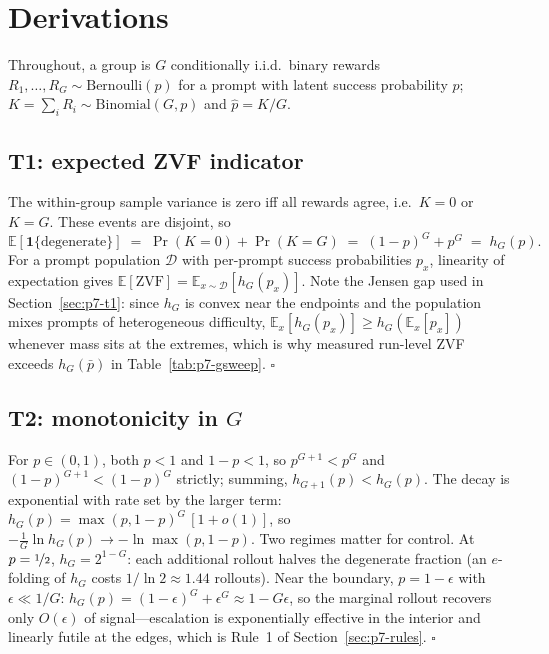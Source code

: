 \documentclass{article}
\providecommand{\eps}{\ensuremath{\epsilon}}
\newcommand{\E}{\mathbb{E}}
\begin{document}
\section{Derivations}
\label{sec:p7-appendix}
Throughout, a group is $G$ conditionally i.i.d.\ binary rewards
$R_1, \dots, R_G \sim \mathrm{Bernoulli}(p)$ for a prompt with latent
success probability $p$; $K = \sum_i R_i \sim \mathrm{Binomial}(G, p)$ and
$\hat p = K/G$.

\subsection{T1: expected ZVF indicator}
\label{sec:p7-appendix-t1}
The within-group sample variance is zero iff all rewards agree, i.e.\
$K = 0$ or $K = G$. These events are disjoint, so
\begin{equation}
  \E[\mathbf{1}\{\text{degenerate}\}]
  \;=\; \Pr(K = 0) + \Pr(K = G)
  \;=\; (1-p)^G + p^G
  \;=\; h_G(p).
\end{equation}
For a prompt population $\mathcal{D}$ with per-prompt success probabilities
$p_x$, linearity of expectation gives
$\E[\mathrm{ZVF}] = \E_{x \sim \mathcal{D}}[h_G(p_x)]$. Note the Jensen gap
used in Section~\ref{sec:p7-t1}: since $h_G$ is convex near the endpoints
and the population mixes prompts of heterogeneous difficulty,
$\E_x[h_G(p_x)] \geq h_G(\E_x[p_x])$ whenever mass sits at the extremes,
which is why measured run-level ZVF exceeds $h_G(\bar p)$ in
Table~\ref{tab:p7-gsweep}. \hfill$\square$

\subsection{T2: monotonicity in $G$}
\label{sec:p7-appendix-t2}
For $p \in (0,1)$, both $p < 1$ and $1-p < 1$, so $p^{G+1} < p^G$ and
$(1-p)^{G+1} < (1-p)^G$ strictly; summing,
$h_{G+1}(p) < h_G(p)$. The decay is exponential with rate set by the larger
term: $h_G(p) = \max(p, 1-p)^G\,[1 + o(1)]$, so
$-\frac{1}{G}\ln h_G(p) \to -\ln \max(p, 1-p)$. Two regimes matter for
control. At $p = \nicefrac12$, $h_G = 2^{1-G}$: each additional rollout
halves the degenerate fraction (an $e$-folding of $h_G$ costs
$1/\ln 2 \approx 1.44$ rollouts). Near the boundary, $p = 1 - \eps$ with
$\eps \ll 1/G$: $h_G(p) = (1-\eps)^G + \eps^G \approx 1 - G\eps$, so the
marginal rollout recovers only $O(\eps)$ of signal---escalation is
exponentially effective in the interior and linearly futile at the edges,
which is Rule~1 of Section~\ref{sec:p7-rules}. \hfill$\square$
\end{document}
